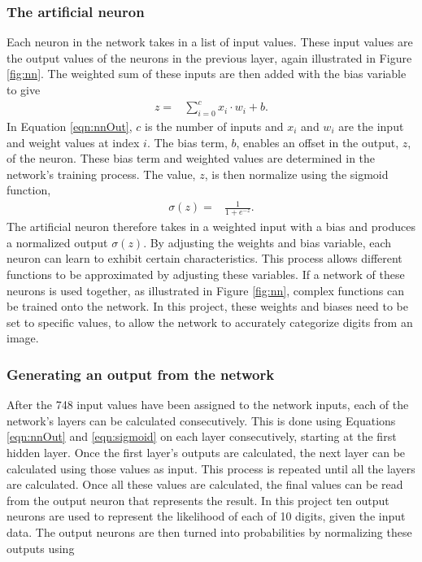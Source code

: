 \subsubsection{The artificial neuron}
Each neuron in the network takes in a list of input values. These input values are the output values of the neurons in the previous layer, again illustrated in Figure \ref{fig:nn}. The weighted sum of these inputs are then added with the bias variable to give
\begin{align}
  z =  &\displaystyle{\sum_{i=0}^{c} x_{i}\cdot w_{i} + b}.
\label{eqn:nnOut}
\end{align}
In Equation \ref{eqn:nnOut}, $c$ is the number of inputs and $x_{i}$ and $w_{i}$ are the input and weight values at index $i$. The bias term, $b$, enables an offset in the output, $z$, of the neuron. These bias term and weighted values are determined in the network's training process. The value, $z$, is then normalize using the sigmoid function,
\begin{align}
  \sigma(z) =  &\displaystyle{\frac{1}{1 + e^{-z}}}.
\label{eqn:sigmoid}
\end{align}
The artificial neuron therefore takes in a weighted input with a bias and produces a normalized output $\sigma(z)$. By adjusting the weights and bias variable, each neuron can learn to exhibit certain characteristics. This process allows different functions to be approximated by adjusting these variables. If a network of these neurons is used together, as illustrated in Figure \ref{fig:nn}, complex functions can be trained onto the network. In this project, these weights and biases need to be set to specific values, to allow the network to accurately categorize digits from an image.

\subsubsection{Generating an output from the network}
After the 748 input values have been assigned to the network inputs, each of the network's layers can be calculated consecutively. This is done using Equations \ref{eqn:nnOut} and \ref{eqn:sigmoid} on each layer consecutively, starting at the first hidden layer. Once the first layer's outputs are calculated, the next layer can be calculated using those values as input. This process is repeated until all the layers are calculated. Once all these values are calculated, the final values can be read from the output neuron that represents the result. In this project ten output neurons are used to represent the likelihood of each of 10 digits, given the input data. The output neurons are then turned into probabilities by normalizing these outputs using

